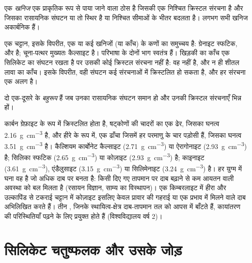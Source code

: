 \begin{definition}[खनिज]\label{def:b1:rock-forming-minerals:mineral}
एक \emph{खनिज} एक प्राकृतिक रूप से पाया जाने वाला ठोस है जिसकी एक निश्चित क्रिस्टल संरचना है और
जिसका रासायनिक संघटन या तो स्थिर है या निश्चित सीमाओं के भीतर बदलता है। लगभग सभी खनिज अकार्बनिक हैं।
\end{definition}

एक चट्टान, इसके विपरीत, एक या कई खनिजों (या काँच) के कणों का समुच्चय है: ग्रेनाइट स्फटिक,  और  है;
चूना-पत्थर मुख्यतः कैल्साइट है। परिभाषा के दोनों भाग स्वतंत्र हैं। खिड़की का काँच एक सिलिकेट का संघटन रखता है
पर उसकी कोई क्रिस्टल संरचना नहीं है: वह  नहीं है, और न ही शीतल लावा का काँच। इसके विपरीत, वही संघटन कई
संरचनाओं में क्रिस्टलित हो सकता है, और हर संरचना एक अलग  है।

\begin{definition}[बहुरूप]\label{def:b1:rock-forming-minerals:polymorph}
दो  एक-दूसरे के \emph{बहुरूप} हैं जब उनका रासायनिक संघटन समान हो और उनकी क्रिस्टल संरचनाएँ भिन्न हों।
\end{definition}

कार्बन ग्रेफ़ाइट के रूप में क्रिस्टलित होता है, षट्कोणों की चादरों का एक ढेर, जिसका घनत्व \qty{2.16}{g.cm^{-3}} है,
और हीरे के रूप में, एक ढाँचा जिसमें हर परमाणु के चार पड़ोसी हैं, जिसका घनत्व \qty{3.51}{g.cm^{-3}} है। कैल्शियम
कार्बोनेट कैल्साइट (\qty{2.71}{g.cm^{-3}}) या ऐरागोनाइट (\qty{2.93}{g.cm^{-3}}) है; सिलिका स्फटिक
(\qty{2.65}{g.cm^{-3}}) या कोज़ाइट (\qty{2.93}{g.cm^{-3}}) है;  काइनाइट (\qty{3.61}{g.cm^{-3}}),
एंडैलुसाइट (\qty{3.15}{g.cm^{-3}}) या सिलिमेनाइट (\qty{3.24}{g.cm^{-3}}) है।
हर युग्म में घना  वह है जो अधिक दाब पर बनता है: किसी दिए गए तापमान पर दाब बढ़ाने से कम आयतन वाली अवस्था
को बल मिलता है (रसायन विज्ञान, साम्य का विस्थापन)। एक किम्बरलाइट में हीरा और उल्कापिंड से टकराई चट्टान में कोज़ाइट
इसलिए केवल प्रावार की गहराई या एक प्रभाव में मिलने वाले दाब अभिलिखित करते हैं। तीन  , जिनके
स्थायित्व-क्षेत्र दाब-तापमान तल को आपस में बाँटते हैं, कायांतरण की परिस्थितियाँ पढ़ने के लिए प्रयुक्त होते हैं
(विश्वविद्यालय वर्ष 2)।

\section{सिलिकेट चतुष्फलक और उसके जोड़}

